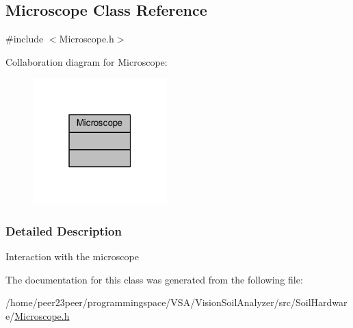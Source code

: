 \hypertarget{class_microscope}{}\subsection{Microscope Class Reference}
\label{class_microscope}


{\ttfamily \#include $<$Microscope.\+h$>$}



Collaboration diagram for Microscope\+:
\nopagebreak
\begin{figure}[H]
\begin{center}
\leavevmode
\includegraphics[width=147pt]{class_microscope__coll__graph}
\end{center}
\end{figure}


\subsubsection{Detailed Description}
Interaction with the microscope 

The documentation for this class was generated from the following file\+:\begin{DoxyCompactItemize}
\item 
/home/peer23peer/programmingspace/\+V\+S\+A/\+Vision\+Soil\+Analyzer/src/\+Soil\+Hardware/\hyperlink{_microscope_8h}{Microscope.\+h}\end{DoxyCompactItemize}
